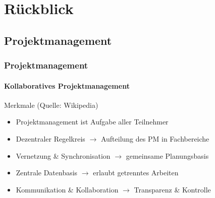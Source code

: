 \section{Rückblick}

\author{Ervin Mazlagi\'c}

\subsection{Projektmanagement}
\begin{frame}
	\frametitle{Projektmanagement\hfill{}\footnotesize \group}
	\framesubtitle{Kollaboratives Projektmanagement}
	\begin{block}{Merkmale (Quelle: Wikipedia)}
		\begin{itemize}
			\item Projektmanagement ist Aufgabe aller Teilnehmer
			\item Dezentraler Regelkreis $\rightarrow$ Aufteilung des PM in Fachbereiche
			\item Vernetzung \& Synchronisation $\rightarrow$ gemeinsame Planungsbasis
			\item Zentrale Datenbasis $\rightarrow$ erlaubt getrenntes Arbeiten
			\item Kommunikation \& Kollaboration $\rightarrow$ Transparenz \& Kontrolle
		\end{itemize}
	\end{block}
\end{frame}

